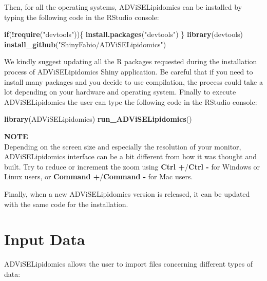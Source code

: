 \documentclass[
]{book}
\newenvironment{Shaded}{\begin{snugshade}}{\end{snugshade}}
\newcommand{\ControlFlowTok}[1]{\textcolor[rgb]{0.13,0.29,0.53}{\textbf{#1}}}
\newcommand{\FunctionTok}[1]{\textcolor[rgb]{0.13,0.29,0.53}{\textbf{#1}}}
\newcommand{\NormalTok}[1]{#1}
\newcommand{\SpecialCharTok}[1]{\textcolor[rgb]{0.81,0.36,0.00}{\textbf{#1}}}
\newcommand{\StringTok}[1]{\textcolor[rgb]{0.31,0.60,0.02}{#1}}
\begin{document}
Then, for all the operating systems, ADViSELipidomics can be installed by typing the following code in the RStudio console:

\begin{Shaded}
\begin{Highlighting}[]
\ControlFlowTok{if}\NormalTok{(}\SpecialCharTok{!}\FunctionTok{require}\NormalTok{(}\StringTok{"devtools"}\NormalTok{))\{}
  \FunctionTok{install.packages}\NormalTok{(}\StringTok{"devtools"}\NormalTok{)}
\NormalTok{\}}
\FunctionTok{library}\NormalTok{(devtools)}
\FunctionTok{install\_github}\NormalTok{(}\StringTok{"ShinyFabio/ADViSELipidomics"}\NormalTok{)}
\end{Highlighting}
\end{Shaded}

We kindly suggest updating all the R packages requested during the installation process of ADViSELipidomics Shiny application. Be careful that if you need to install many packages and you decide to use compilation, the process could take a lot depending on your hardware and operating system.
Finally to execute ADViSELipidomics the user can type the following code in the RStudio console:

\begin{Shaded}
\begin{Highlighting}[]
\FunctionTok{library}\NormalTok{(ADViSELipidomics)}
\FunctionTok{run\_ADViSELipidomics}\NormalTok{()}
\end{Highlighting}
\end{Shaded}

\textbf{NOTE}\\
Depending on the screen size and especially the resolution of your monitor, ADViSELipidomics interface can be a bit different from how it was thought and built. Try to reduce or increment the zoom using \textbf{Ctrl +}/\textbf{Ctrl -} for Windows or Linux users, or \textbf{Command +}/\textbf{Command -} for Mac users.

Finally, when a new ADViSELipidomics version is released, it can be updated with the same code for the installation.

\hypertarget{inputdata}{%
\chapter{Input Data}\label{inputdata}}

ADViSELipidomics allows the user to import files concerning different types of data:
\end{document}
